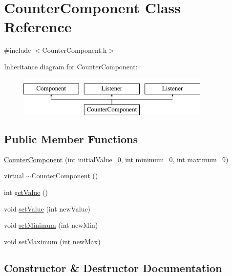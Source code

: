 \hypertarget{classCounterComponent}{}\section{Counter\+Component Class Reference}
\label{classCounterComponent}


{\ttfamily \#include $<$Counter\+Component.\+h$>$}

Inheritance diagram for Counter\+Component\+:\begin{figure}[H]
\begin{center}
\leavevmode
\includegraphics[height=2.000000cm]{classCounterComponent}
\end{center}
\end{figure}
\subsection*{Public Member Functions}
\begin{DoxyCompactItemize}
\item 
\mbox{\hyperlink{classCounterComponent_af7cf61e173df003c856a61ff5f32f0e5}{Counter\+Component}} (int initial\+Value=0, int minimum=0, int maximum=9)
\item 
virtual \mbox{\hyperlink{classCounterComponent_aebe51e8771ad88b50816790a11779f30}{$\sim$\+Counter\+Component}} ()
\item 
int \mbox{\hyperlink{classCounterComponent_af2f1848a2f5fec6a6b6c44612cb197d6}{get\+Value}} ()
\item 
void \mbox{\hyperlink{classCounterComponent_af79e5b03bb1ead95a5108259c42bd24d}{set\+Value}} (int new\+Value)
\item 
void \mbox{\hyperlink{classCounterComponent_a7a1db869bf4b07038d0c9cb2a01cf0dd}{set\+Minimum}} (int new\+Min)
\item 
void \mbox{\hyperlink{classCounterComponent_aa2711f533b3342f84996e8a9cf73890c}{set\+Maximum}} (int new\+Max)
\end{DoxyCompactItemize}


\subsection{Constructor \& Destructor Documentation}
\mbox{\label{classCounterComponent_af7cf61e173df003c856a61ff5f32f0e5}} 
